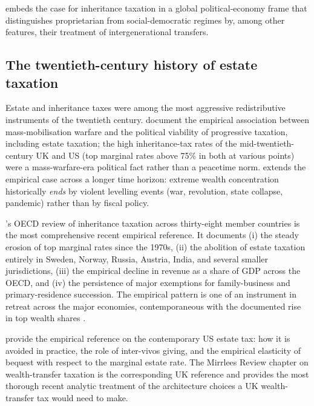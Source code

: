 \documentclass[11pt]{article}
\begin{document}
\citet{piketty2020capital} embeds the case for inheritance taxation
in a global political-economy frame that distinguishes proprietarian
from social-democratic regimes by, among other features, their
treatment of intergenerational transfers.

\subsection{The twentieth-century history of estate taxation}

Estate and inheritance taxes were among the most aggressive
redistributive instruments of the twentieth century.
\citet{scheve2009scheidel} document the empirical association
between mass-mobilisation warfare and the political viability of
progressive taxation, including estate taxation; the high
inheritance-tax rates of the mid-twentieth-century UK and US (top
marginal rates above 75\% in both at various points) were a
mass-warfare-era political fact rather than a peacetime norm.
\citet{scheidel2017leveler} extends the empirical case across a
longer time horizon: extreme wealth concentration historically
\emph{ends} by violent levelling events (war, revolution, state
collapse, pandemic) rather than by fiscal policy.

\citet{oecd2021inheritance}'s OECD review of inheritance taxation
across thirty-eight member countries is the most comprehensive
recent empirical reference.  It documents (i) the steady erosion of
top marginal rates since the 1970s, (ii) the abolition of estate
taxation entirely in Sweden, Norway, Russia, Austria, India, and
several smaller jurisdictions, (iii) the empirical decline in
revenue as a share of GDP across the OECD, and (iv) the persistence
of major exemptions for family-business and primary-residence
succession.  The empirical pattern is one of an instrument in retreat
across the major economies, contemporaneous with the documented rise
in top wealth shares \citep{saez2019triumph, piketty2020capital}.

\citet{kopczuk2003bequest, kopczuk2013taxation} provide the
empirical reference on the contemporary US estate tax: how it is
avoided in practice, the role of inter-vivos giving, and the
empirical elasticity of bequest with respect to the marginal estate
rate.  The Mirrlees Review \citep{mirrlees2011tax} chapter on
wealth-transfer taxation \citep{boadway2010taxation} is the
corresponding UK reference and provides the most thorough recent
analytic treatment of the architecture choices a UK wealth-transfer
tax would need to make.
\end{document}
